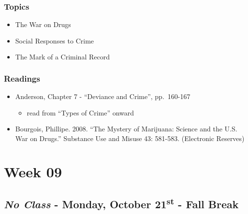 \documentclass[]{book}
\providecommand{\tightlist}{%
  \setlength{\itemsep}{0pt}\setlength{\parskip}{0pt}}
\begin{document}
\hypertarget{topics-15}{%
\subsubsection*{Topics}\label{topics-15}}

\begin{itemize}
\tightlist
\item
  The War on Drugs
\item
  Social Responses to Crime
\item
  The Mark of a Criminal Record
\end{itemize}

\hypertarget{readings-14}{%
\subsubsection*{Readings}\label{readings-14}}

\begin{itemize}
\tightlist
\item
  Anderson, Chapter 7 - ``Deviance and Crime'', pp.~160-167

  \begin{itemize}
  \tightlist
  \item
    read from ``Types of Crime'' onward
  \end{itemize}
\item
  Bourgois, Phillipe. 2008. ``The Mystery of Marijuana: Science and the U.S. War on Drugs.'' Substance Use and Misuse 43: 581-583. (Electronic Reserves)
\end{itemize}

\newpage

\hypertarget{week-09}{%
\section*{Week 09}\label{week-09}}

\hypertarget{no-class---monday-october-21st---fall-break}{%
\subsection*{\texorpdfstring{\emph{No Class} - Monday, October 21\textsuperscript{st} - Fall Break}{No Class - Monday, October 21st - Fall Break}}\label{no-class---monday-october-21st---fall-break}}
\end{document}
